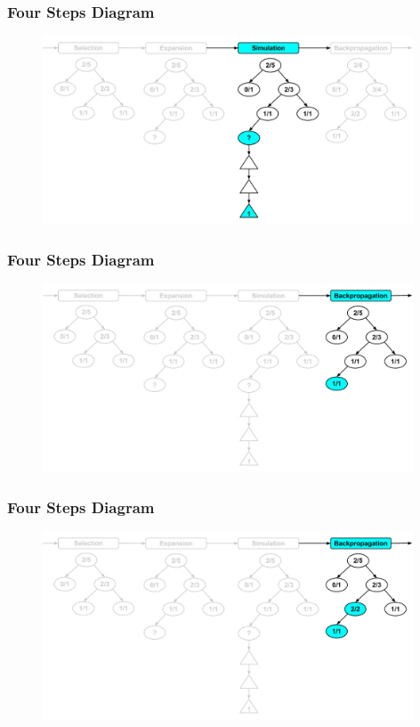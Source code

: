 \documentclass{beamer}
\begin{document}
\begin{frame}[fragile]
\frametitle{Four Steps Diagram}
\begin{figure}[h]
	\includegraphics[width=11cm]{Diagrams/FourSteps/MCTSFourStepProcessThree.pdf}
	\centering
\end{figure}
\end{frame}

\begin{frame}[fragile]
\frametitle{Four Steps Diagram}
\begin{figure}[h]
	\includegraphics[width=11cm]{Diagrams/FourSteps/MCTSFourStepProcessFourOne.pdf}
	\centering
\end{figure}
\end{frame}

\begin{frame}[fragile]
\frametitle{Four Steps Diagram}
\begin{figure}[h]
	\includegraphics[width=11cm]{Diagrams/FourSteps/MCTSFourStepProcessFourTwo.pdf}
	\centering
\end{figure}
\end{frame}
\end{document}
